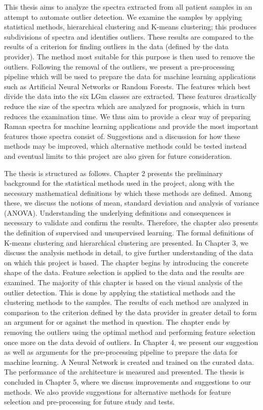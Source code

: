 This thesis aims to analyze the spectra extracted from all patient samples in an attempt to automate outlier detection.%
We examine the samples by applying statistical methods, hierarchical clustering and K-means clustering; this produces subdivisions of spectra and identifies outliers. These results are compared to the results of a criterion for finding outliers in the data (defined by the data provider). The method most suitable for this purpose is then used to remove the outliers. Following the removal of the outliers, we present a pre-processing pipeline which will be used to prepare the data for machine learning applications such as Artificial Neural Networks or Random Forests. The features which best divide the data into the six LGm classes are extracted. These features drastically reduce the size of the spectra which are analyzed for prognosis, which in turn reduces the examination time. We thus aim to provide a clear way of preparing Raman spectra for machine learning applications and provide the most important features those spectra consist of. Suggestions and a discussion for how these methods may be improved, which alternative methods could be tested instead and eventual limits to this project are also given for future consideration.

The thesis is structured as follows. Chapter 2 presents the preliminary background for the statistical methods used in the project, along with the necessary mathematical definitions by which these methods are defined. Among these, we discuss the notions of mean, standard deviation and analysis of variance (ANOVA). Understanding the underlying definitions and consequences is necessary to validate and confirm the results. Therefore, the chapter also presents the definition of supervised and unsupervised learning. The formal definitions of K-means clustering and hierarchical clustering are presented. In Chapter 3, we discuss the analysis methods in detail, to give further understanding of the data on which this project is based. The chapter begins by introducing the concrete shape of the data. Feature selection is applied to the data and the results are examined. The majority of this chapter is based on the visual analysis of the outlier detection. This is done by applying the statistical methods and the clustering methods to the samples. The results of each method are analyzed in comparison to the criterion defined by the data provider in greater detail to form an argument for or against the method in question. The chapter ends by removing the outliers using the optimal method and performing feature selection once more on the data devoid of outliers. In Chapter 4, we present our suggestion as well as arguments for the pre-processing pipeline to prepare the data for machine learning. A Neural Network is created and trained on the curated data. The performance of the architecture is measured and presented. The thesis is concluded in Chapter 5, where we discuss improvements and suggestions to our methods. We also provide suggestions for alternative methods for feature selection and pre-processing for future study and tests.
